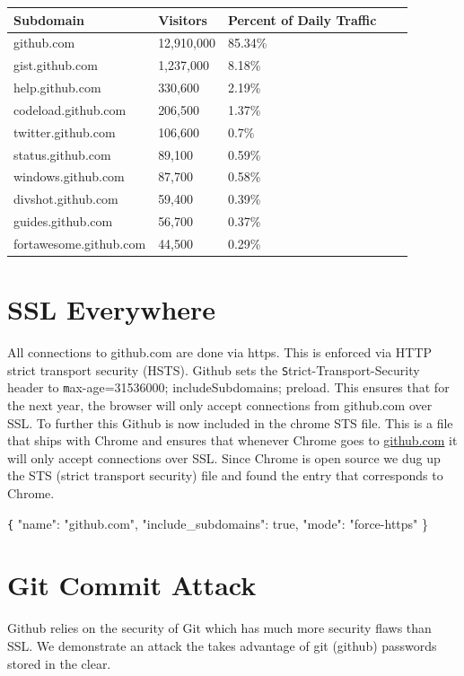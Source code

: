 \documentclass[12pt]{article}
\makeatletter
\renewcommand{\tt}[1]{\texttt{#1}}
\renewenvironment{figure}
               {\def\@captype {figure}}
               {}
\renewenvironment{table}
               {\def\@captype {table}}
               {}
\makeatother
\begin{document}
\begin{figure}
\begin{table}
\begin{tabular}{| l | l | l | l | l | }
\hline

Subdomain & Visitors & Percent of Daily Traffic \\ \hline
github.com & 12,910,000 & 85.34\% \\ \hline
gist.github.com & 1,237,000 & 8.18\%  \\ \hline
help.github.com & 330,600 & 2.19\%  \\ \hline
codeload.github.com & 206,500 & 1.37\%  \\ \hline
twitter.github.com & 106,600 & 0.7\%  \\ \hline
status.github.com & 89,100 & 0.59\%  \\ \hline
windows.github.com & 87,700 & 0.58\%  \\ \hline
divshot.github.com & 59,400 & 0.39\%  \\ \hline
guides.github.com & 56,700 & 0.37\%  \\ \hline
fortawesome.github.com & 44,500 & 0.29\%  \\ \hline
\end{tabular}
\end{table}
\caption{\newline}
\label{fig:mig_over}
\end{figure}


\section{SSL Everywhere}

All connections to github.com are done via https. This is enforced via HTTP strict transport security (HSTS). Github sets the {\tt Strict-Transport-Security} header to {\tt max-age=31536000; includeSubdomains; preload}. This ensures that for the next year, the browser will only accept connections from github.com over SSL. To further this Github is now included in the chrome STS file. This is a file that ships with Chrome and ensures that whenever Chrome goes to \url{github.com} it will only accept connections over SSL. Since Chrome is open source we dug up the STS (strict transport security) file and found the entry that corresponds to Chrome.

{\tt \{ "name": "github.com", "include\_subdomains": true, "mode": "force-https" \}}


\section{Git Commit Attack}
Github relies on the security of Git which has much more security flaws than SSL. We demonstrate an attack the takes advantage of git (github) passwords stored in the clear.
\end{document}
